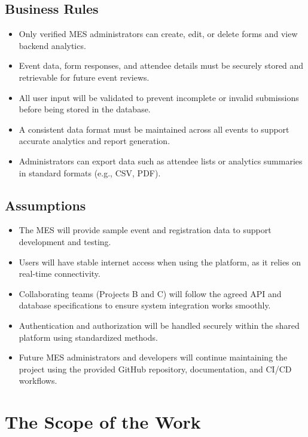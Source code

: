 \documentclass[12pt]{article}
\begin{document}
\subsection{Business Rules}

\begin{itemize}
    \item Only verified MES administrators can create, edit, or delete forms and view backend analytics.
    \item Event data, form responses, and attendee details must be securely stored and retrievable for future event reviews.
    \item All user input will be validated to prevent incomplete or invalid submissions before being stored in the database.
    \item A consistent data format must be maintained across all events to support accurate analytics and report generation.
    \item Administrators can export data such as attendee lists or analytics summaries in standard formats (e.g., CSV, PDF).
\end{itemize}

\subsection{Assumptions}

\begin{itemize}
    \item The MES will provide sample event and registration data to support development and testing.
    \item Users will have stable internet access when using the platform, as it relies on real-time connectivity.
    \item Collaborating teams (Projects B and C) will follow the agreed API and database specifications to ensure system integration works smoothly.
    \item Authentication and authorization will be handled securely within the shared platform using standardized methods.
    \item Future MES administrators and developers will continue maintaining the project using the provided GitHub repository, documentation, and CI/CD workflows.
\end{itemize}


\section{The Scope of the Work}
\end{document}
